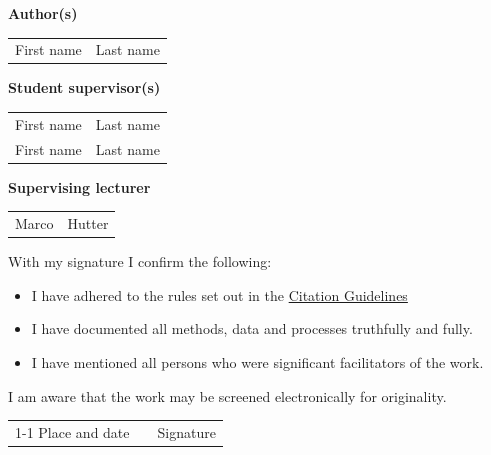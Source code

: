 \textbf{Author(s)}

\vspace{0.5cm}

\begin{tabular}{ p{5cm} p{5cm} }
  First name & Last name \\
\end{tabular}

\vspace{0.5cm}

\textbf{Student supervisor(s)}

\vspace{0.5cm}

\begin{tabular}{ p{5cm} p{5cm} }
  First name & Last name \\
  First name & Last name \\
\end{tabular}

\vspace{0.5cm}

%
%
%

\textbf{Supervising lecturer}

\vspace{0.5cm}

\begin{tabular}{ p{5cm} p{5cm} }
  Marco & Hutter \\
\end{tabular}

\vspace{0.5cm}

With my signature I confirm the following:
\begin{itemize}
    \item I have adhered to the rules set out in the \href{https://www.ethz.ch/content/dam/ethz/main/education/rechtliches-abschluesse/leistungskontrollen/plagiarism-citationetiquette.pdf}{Citation Guidelines}
    \item I have documented all methods, data and processes truthfully and fully.
    \item I have mentioned all persons who were significant facilitators of the work.
\end{itemize}

\vspace{0.5cm}

I am aware that the work may be screened electronically for originality.

\vspace{2.75cm}

\begin{tabular}{ p{5cm} p{1cm} p{5cm} }
  \cline{1-1} \cline{3-3}
  Place and date & & Signature \\
\end{tabular}
